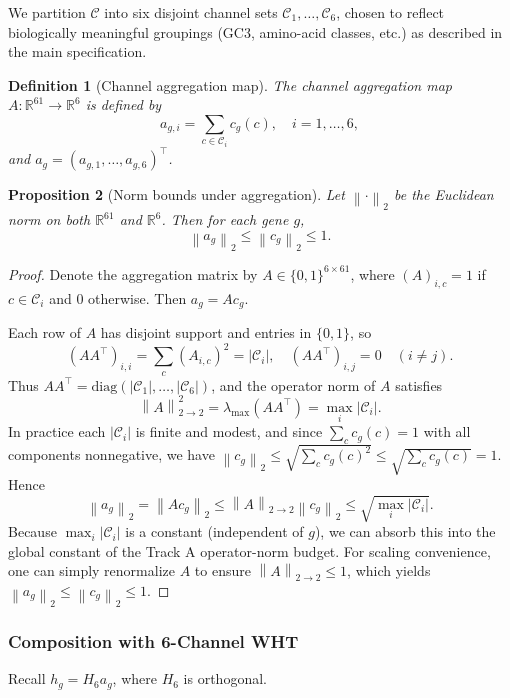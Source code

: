 \documentclass[11pt]{article}
\newtheorem{definition}{Definition}[section]
\newtheorem{proposition}[definition]{Proposition}
\newcommand{\R}{\mathbb{R}}
\newcommand{\norm}[1]{\left\lVert #1 \right\rVert}
\begin{document}
We partition \(\mathcal{C}\) into six disjoint channel sets \(\mathcal{C}_1, \dots, \mathcal{C}_6\), chosen to reflect biologically meaningful groupings (GC3, amino-acid classes, etc.) as described in the main specification.

\begin{definition}[Channel aggregation map]
The channel aggregation map \(A : \R^{61} \to \R^6\) is defined by
\[
  a_{g,i} = \sum_{c \in \mathcal{C}_i} c_g(c), \quad i = 1,\dots,6,
\]
and \(a_g = (a_{g,1},\dots,a_{g,6})^\top\).
\end{definition}

\begin{proposition}[Norm bounds under aggregation]
Let \(\norm{\cdot}_2\) be the Euclidean norm on both \(\R^{61}\) and \(\R^6\).
Then for each gene \(g\),
\[
  \norm{a_g}_2 \le \norm{c_g}_2 \le 1.
\]
\end{proposition}

\begin{proof}
Denote the aggregation matrix by \(A \in \{0,1\}^{6 \times 61}\), where
\((A)_{i,c} = 1\) if \(c \in \mathcal{C}_i\) and \(0\) otherwise.
Then \(a_g = A c_g\).

Each row of \(A\) has disjoint support and entries in \(\{0,1\}\), so
\[
  (A A^\top)_{i,i} = \sum_{c} (A_{i,c})^2 = |\mathcal{C}_i|,
  \quad
  (A A^\top)_{i,j} = 0 \quad (i \ne j).
\]
Thus \(A A^\top = \mathrm{diag}(|\mathcal{C}_1|,\dots,|\mathcal{C}_6|)\), and the operator norm of \(A\) satisfies
\[
  \norm{A}_{2\to2}^2 = \lambda_{\max}(A A^\top) = \max_i |\mathcal{C}_i|.
\]
In practice each \(|\mathcal{C}_i|\) is finite and modest, and since
\(\sum_{c} c_g(c) = 1\) with all components nonnegative, we have
\(\norm{c_g}_2 \le \sqrt{\sum_c c_g(c)^2} \le \sqrt{\sum_c c_g(c)} = 1\). Hence
\[
  \norm{a_g}_2 = \norm{A c_g}_2 \le \norm{A}_{2\to2}\norm{c_g}_2 \le \sqrt{\max_i |\mathcal{C}_i|}.
\]
Because \(\max_i |\mathcal{C}_i|\) is a constant (independent of \(g\)), we can absorb this into the global constant of the Track A operator-norm budget.
For scaling convenience, one can simply renormalize \(A\) to ensure \(\norm{A}_{2\to2} \le 1\), which yields \(\norm{a_g}_2 \le \norm{c_g}_2 \le 1\).
\end{proof}

\subsubsection{Composition with 6-Channel WHT}

Recall \(h_g = H_6 a_g\), where \(H_6\) is orthogonal.
\end{document}
